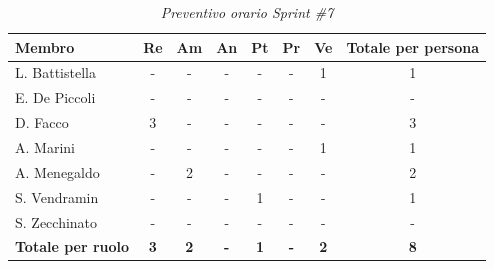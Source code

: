 ﻿\documentclass[a4paper, 10pt, colorlinks=true, linkcolor=black, urlcolor=blue, citecolor=blue, hidelinks]{article}
\renewcommand{\arraystretch}{1.2}
\begin{document}
\begin{table}[H]
    \centering
    \renewcommand{\arraystretch}{1.4}
    \begin{tabular}{|l|c|c|c|c|c|c|c|}
        \hline
        \rowcolor{bluBitless!15}
        \textbf{Membro} & \textbf{Re} & \textbf{Am} & \textbf{An} & \textbf{Pt} & \textbf{Pr} & \textbf{Ve} & \textbf{Totale per persona} \\
        \hline
        L. Battistella & - & - & - & - & - & 1 & 1 \\ \hline
        E. De Piccoli & - & - & - & - & - & - & - \\ \hline
        D. Facco & 3 & - & - & - & - & - & 3 \\ \hline
        A. Marini & - & - & - & - & - & 1 & 1 \\ \hline
        A. Menegaldo & - & 2 & - & - & - & - & 2 \\ \hline
        S. Vendramin & - & - & - & 1 & - & - & 1 \\ \hline
        S. Zecchinato & - & - & - & - & - & - & - \\ \hline
        \rowcolor{bluBitless!8}
        \textbf{Totale per ruolo} & \textbf{3} & \textbf{2} & \textbf{-} & \textbf{1} & \textbf{-} & \textbf{2} & \textbf{8} \\
        \hline
    \end{tabular}
    \caption{\textit{Preventivo orario Sprint \#7}}
\end{table}
\end{document}
